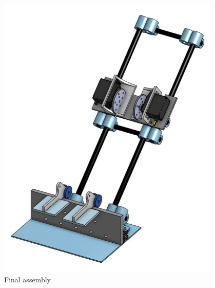 \begin{figure}[htp]
\centering
\includegraphics[width=0.95\textwidth, angle=0]{Meetings/October/10-30-21/10-30-21_CAD_Figure8 - Nathan Forrer.JPG}
\caption{Final assembly}
\label{fig:pic7}
\end{figure}


